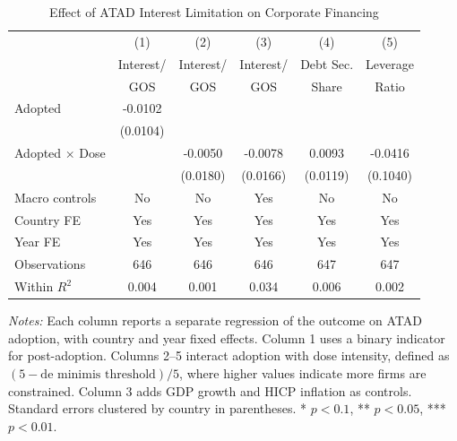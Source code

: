 \begin{table}[t]
\centering
\caption{Effect of ATAD Interest Limitation on Corporate Financing}
\label{tab:main}
\small
\begin{tabular}{lccccc}
\toprule
& (1) & (2) & (3) & (4) & (5) \\
& Interest/ & Interest/ & Interest/ & Debt Sec. & Leverage \\
& GOS & GOS & GOS & Share & Ratio \\
\midrule
Adopted & -0.0102 & & & & \\
& (0.0104) & & & & \\
Adopted $\times$ Dose & & -0.0050 & -0.0078 & 0.0093 & -0.0416 \\
& & (0.0180) & (0.0166) & (0.0119) & (0.1040) \\
\midrule
Macro controls & No & No & Yes & No & No \\
Country FE & Yes & Yes & Yes & Yes & Yes \\
Year FE & Yes & Yes & Yes & Yes & Yes \\
Observations & 646 & 646 & 646 & 647 & 647 \\
Within $R^2$ & 0.004 & 0.001 & 0.034 & 0.006 & 0.002 \\
\bottomrule
\end{tabular}
\begin{tablenotes}
\item \textit{Notes:} Each column reports a separate regression of the outcome on ATAD adoption, with country and year fixed effects. Column 1 uses a binary indicator for post-adoption. Columns 2--5 interact adoption with dose intensity, defined as $(5 - \text{de minimis threshold})/5$, where higher values indicate more firms are constrained. Column 3 adds GDP growth and HICP inflation as controls. Standard errors clustered by country in parentheses. * $p<0.1$, ** $p<0.05$, *** $p<0.01$.
\end{tablenotes}
\end{table}
